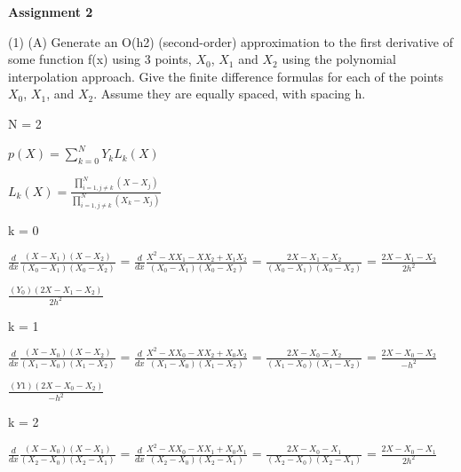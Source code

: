 \documentclass{report}
\begin{document}
 
 \begin{center}
 \textbf{Assignment 2}
\end{center}

\begin{center}
(1) (A) Generate an O(h2) (second-order) approximation to the first derivative of some function f(x) using 3 points, $X_0$, $X_1$ and $X_2$ using the polynomial interpolation approach. Give the finite difference formulas for each of the points $X_0$, $X_1$, and $X_2$. Assume they are equally spaced, with spacing h.
\end{center}

\begin{center}
N = 2

 $p(X) = \sum\limits_{k = 0}^N Y_kL_k(X)$
\end{center}

\begin{center}
 $L_k(X) = \frac{\prod\limits_{i=1,j \neq k}^N (X - X_j)}{\prod\limits_{i=1, j \neq k}^N (X_k - X_j)}$
\end{center}

k = 0

 \begin{center}
 $\frac{d}{dx}$$\frac{(X - X_1)(X - X_2)}{(X_0 - X_1)(X_0 - X_2)}$ = $\frac{d}{dx}$$\frac{X^2 - XX_1 - XX_2 + X_1X_2}{(X_0 - X_1)(X_0 - X_2)}$ = $\frac{2X - X_1 - X_2}{(X_0 - X_1)(X_0 - X_2)}$ = $\frac{2X - X_1 - X_2}{2h^2}$
\end{center}

\begin{center}
$\frac{(Y_0)(2X - X_1 - X_2)}{2h^2}$
\end{center}

k = 1

\begin{center}
$\frac{d}{dx}$$\frac{(X - X_0)(X - X_2)}{(X_1 - X_0)(X_1 - X_2)}$ = $\frac{d}{dx}$$\frac{X^2 - XX_0 - XX_2 + X_0X_2}{(X_1 - X_0)(X_1 - X_2)}$ = $\frac{2X - X_0 - X_2}{(X_1 - X_0)(X_1 - X_2)}$ = $\frac{2X - X_0 - X_2}{-h^2}$
\end{center}

\begin{center}
$\frac{(Y1)(2X - X_0 - X_2)}{-h^2}$
\end{center}

k = 2

\begin{center}
$\frac{d}{dx}$$\frac{(X - X_0)(X - X_1)}{(X_2 - X_0)(X_2 - X_1)}$ = $\frac{d}{dx}$$\frac{X^2 - XX_0 - XX_1 + X_0X_1}{(X_2 - X_0)(X_2 - X_1)}$ = $\frac{2X - X_0 - X_1}{(X_2 - X_0)(X_2 - X_1)}$ = $\frac{2X - X_0 - X_1}{2h^2}$
\end{center}
\end{document}
